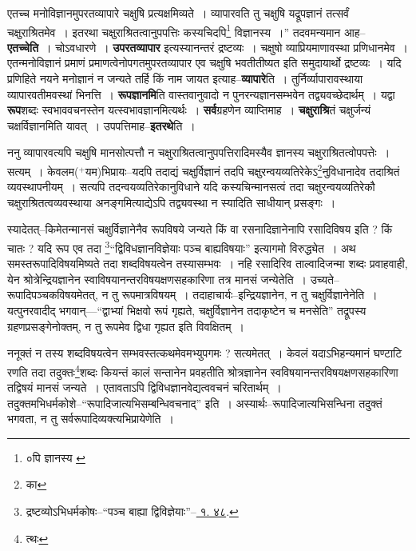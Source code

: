 \documentclass[article,12pt,a4paper]{memoir}
\newcommand{\add}[1]{($^{+}$#1)}
\begin{document}
	एतच्च मनोविज्ञानमुपरतव्यापारे चक्षुषि प्रत्यक्षमिव्यते । व्यापारवति तु चक्षुषि यद्रूपज्ञानं तत्सर्वं चक्षुराश्रितमेव । इतरथा चक्षुराश्रितत्वानुपपत्तिः कस्यचिदपि\footnote{०पि ज्ञानस्य \cite{dp-msB} \cite{dp-msD}} विज्ञानस्य ।” तदवमन्यमान आह--\textbf{एतच्चेति} । चोऽवधारणे । \textbf{उपरतव्यापार} इत्यस्यानन्तरं द्रष्टव्यः । चक्षुषो व्याप्रियमाणावस्था प्रणिधानमेव । एतन्मनोविज्ञानं प्रमाणं प्रमाणत्वेनोपगतमुपरतव्यापार एव चक्षुषि भवतीतीष्यत इति समुदायार्थो द्रष्टव्यः । यदि प्रणिहिते नयने मनोज्ञानं न जन्यते तर्हि किं नाम जायत इत्याह--\textbf{व्यापारे}ति । तुर्निर्व्यापारावस्थाया व्यापारवतीमवस्थां भिनत्ति । \textbf{रूपज्ञानमि}ति वास्तवानुवादो न पुनरन्यज्ञानसम्भवेन तद्व्यवच्छेदार्थम् । यद्वा \textbf{रूप}शब्दः स्वभाववचनस्तेन यत्स्वभावज्ञानमित्यर्थः । \textbf{सर्व}ग्रहणेन व्याप्तिमाह । \textbf{चक्षुराश्रि}तं चक्षुर्जन्यं चक्षर्विज्ञानमिति यावत् । उपपत्तिमाह--\textbf{इतरथे}ति ।
	\pend
      

	  \pstart ननु व्यापारवत्यपि चक्षुषि मानसोत्पत्तौ न चक्षुराश्रितत्वानुपपत्तिरादिमस्यैव ज्ञानस्य चक्षुराश्रितत्वोपपत्तेः । सत्यम् । केवलम\add{यम}भिप्रायः--यदपि तदाद्यं चक्षुर्विज्ञानं तदपि चक्षुरन्वयव्यतिरेकेऽ\footnote{का}\-नुविधानादेव तदाश्रितं व्यवस्थापनीयम् । सत्यपि तदन्वयव्यतिरेकानुविधाने यदि कस्यचिन्मानसत्वं तदा चक्षुरन्वयव्यतिरेकौ चक्षुराश्रितत्वव्यवस्थाया अनङ्गमित्याद्येऽपि तद्व्यवस्था न स्यादिति साधीयान् प्रसङ्गः ।
	\pend
      

	  \pstart स्यादेतत्--किमेतन्मानसं चक्षुर्विज्ञानेनैव रूपविषये जन्यते किं वा रसनादिज्ञानेनापि रसादिविषय इति ? किं चातः ? यदि रूप एव तदा \footnote{द्रष्टव्योऽभिधर्मकोषः--“पञ्च बाह्या द्विविज्ञेयाः”--\href{http://http://sarit.indology.info/?cref=ak.1.48}{ १. ४८}.}“द्विविधज्ञानविज्ञेयाः पञ्च बाह्यविषयाः” इत्यागमो विरुद्ध्येत । अथ समस्तरूपादिविषयमिष्यते तदा शब्दविषयत्वेन तस्यासम्भवः । नहि रसादिरिव ताल्वादिजन्मा शब्दः प्रवाहवाही, येन श्रोत्रेन्द्रियज्ञानेन स्वाविषयानन्तरविषयक्षणसहकारिणा तत्र मानसं जन्येतेति । उच्यते--रूपादिपञ्चकविषयमेतत्, न तु रूपमात्रविषयम् । तदाहाचार्यः--इन्द्रियज्ञानेन, न तु चक्षुर्विज्ञानेनेति । यत्पुनरवादीद् भगवान्—“द्वाभ्यां भिक्षवो रूपं गृह्यते, चक्षुर्विज्ञानेन तदाकृष्टेन च मनसेति” तद्रूपस्य ग्रहणप्रसङ्गेनोक्तम्, न तु रूपमेव द्विधा गृह्यत इति विवक्षितम् ।
	\pend
      

	  \pstart ननूक्तं न तस्य शब्दविषयत्वेन सम्भवस्तत्कथमेवमभ्युपगमः ? सत्यमेतत् । केवलं यदाऽभिहन्यमानं घण्टाटि रणति तदा तदुक्तः\footnote{त्थः}\-शब्दः कियन्तं कालं सन्तानेन प्रवहतीति श्रोत्रज्ञानेन स्वविषयानन्तरविषयक्षणसहकारिणा तद्विषयं मानसं जन्यते । एतावताऽपि द्विविधज्ञानवेद्यत्ववचनं चरितार्थम् । तदुक्तमभिधर्मकोशे--“रूपादिजात्यभिसम्बन्धिवचनाद्” इति । अस्यार्थः--रूपादिजात्यभिसन्धिना तदुक्तं भगवता, न तु \leavevmode{} सर्वरूपादिव्यक्त्यभिप्रायेणेति ।
	\pend
      
\end{document}
